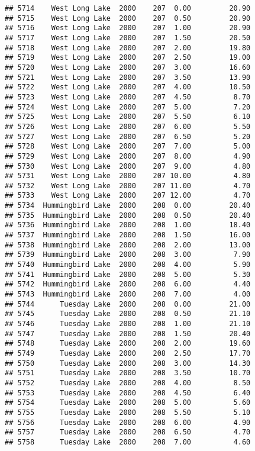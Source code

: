 \documentclass[
]{article}
\begin{document}
\begin{verbatim}
## 5714    West Long Lake  2000    207  0.00         20.90
## 5715    West Long Lake  2000    207  0.50         20.90
## 5716    West Long Lake  2000    207  1.00         20.90
## 5717    West Long Lake  2000    207  1.50         20.50
## 5718    West Long Lake  2000    207  2.00         19.80
## 5719    West Long Lake  2000    207  2.50         19.00
## 5720    West Long Lake  2000    207  3.00         16.60
## 5721    West Long Lake  2000    207  3.50         13.90
## 5722    West Long Lake  2000    207  4.00         10.50
## 5723    West Long Lake  2000    207  4.50          8.70
## 5724    West Long Lake  2000    207  5.00          7.20
## 5725    West Long Lake  2000    207  5.50          6.10
## 5726    West Long Lake  2000    207  6.00          5.50
## 5727    West Long Lake  2000    207  6.50          5.20
## 5728    West Long Lake  2000    207  7.00          5.00
## 5729    West Long Lake  2000    207  8.00          4.90
## 5730    West Long Lake  2000    207  9.00          4.80
## 5731    West Long Lake  2000    207 10.00          4.80
## 5732    West Long Lake  2000    207 11.00          4.70
## 5733    West Long Lake  2000    207 12.00          4.70
## 5734  Hummingbird Lake  2000    208  0.00         20.40
## 5735  Hummingbird Lake  2000    208  0.50         20.40
## 5736  Hummingbird Lake  2000    208  1.00         18.40
## 5737  Hummingbird Lake  2000    208  1.50         16.00
## 5738  Hummingbird Lake  2000    208  2.00         13.00
## 5739  Hummingbird Lake  2000    208  3.00          7.90
## 5740  Hummingbird Lake  2000    208  4.00          5.90
## 5741  Hummingbird Lake  2000    208  5.00          5.30
## 5742  Hummingbird Lake  2000    208  6.00          4.40
## 5743  Hummingbird Lake  2000    208  7.00          4.00
## 5744      Tuesday Lake  2000    208  0.00         21.00
## 5745      Tuesday Lake  2000    208  0.50         21.10
## 5746      Tuesday Lake  2000    208  1.00         21.10
## 5747      Tuesday Lake  2000    208  1.50         20.40
## 5748      Tuesday Lake  2000    208  2.00         19.60
## 5749      Tuesday Lake  2000    208  2.50         17.70
## 5750      Tuesday Lake  2000    208  3.00         14.30
## 5751      Tuesday Lake  2000    208  3.50         10.70
## 5752      Tuesday Lake  2000    208  4.00          8.50
## 5753      Tuesday Lake  2000    208  4.50          6.40
## 5754      Tuesday Lake  2000    208  5.00          5.60
## 5755      Tuesday Lake  2000    208  5.50          5.10
## 5756      Tuesday Lake  2000    208  6.00          4.90
## 5757      Tuesday Lake  2000    208  6.50          4.70
## 5758      Tuesday Lake  2000    208  7.00          4.60

\end{verbatim}
\end{document}
